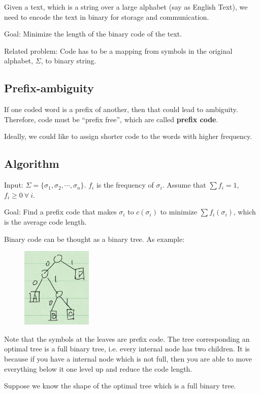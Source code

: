Given a text, which is a string over a large alphabet (say as English Text), we need to encode the text in binary for storage and communication.

Goal: Minimize the length of the binary code of the text.

Related problem: Code has to be a mapping from symbols in the original alphabet, $\Sigma$, to binary string.

\subsection{Prefix-ambiguity}
If one coded word is a prefix of another, then that could lead to ambiguity. Therefore, code must be ``prefix free'', which are called \textbf{prefix code}.

Ideally, we could like to assign shorter code to the words with higher frequency.
\subsection{Algorithm}
Input: $\Sigma = \{\sigma_1, \sigma_2, \cdots, \sigma_n\}$. $f_i$ is the frequency of $\sigma_i$. Assume that $\sum f_i = 1$, $f_i \ge 0 ~\forall ~i$.

Goal: Find a prefix code that makes $\sigma_i$ to $c(\sigma_i)$ to minimize $\sum f_i(\sigma_i)$, which is the average code length.

Binary code can be thought as a binary tree. As example:
\begin{figure}[H]
	\centering
	\includegraphics[width=0.3\textwidth]{binary-code-tree.png}
\end{figure}

Note that the symbols at the leaves are prefix code. The tree corresponding an optimal tree is a full binary tree, i.e. every internal node has two children. It is because if you have a internal node which is not full, then you are able to move everything below it one level up and reduce the code length.

Suppose we know the shape of the optimal tree which is a full binary tree.

